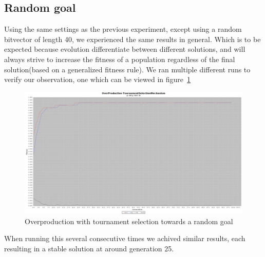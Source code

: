 \subsection{Random goal}
	Using the same settings as the previous experiment, except using a random bitvector of length 40, we experienced the same results in general. Which is to be expected because evolution differentiate between different solutions, and will always strive to increase the fitness of a population regardless of the final solution(based on a generalized fitness rule). We ran multiple different runs to verify our observation, one which can be viewed in figure~\ref{fig:random}
	\begin{figure}[H]%
	\includegraphics[width=\columnwidth]{1/e/random.png}%
	\caption{Overproduction with tournament selection towards a random goal}%
	\label{fig:random}%
	\end{figure}
	When running this several consecutive times we achived similar results, each resulting in a stable solution at around generation 25. 